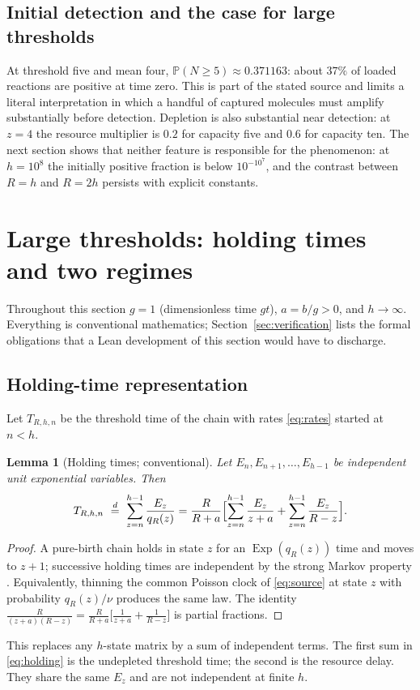 \documentclass[11pt,a4paper]{article}
\theoremstyle{plain}
\newtheorem{lemma}[theorem]{Lemma}
\theoremstyle{definition}
\theoremstyle{remark}
\newcommand{\Prob}{\mathbb P}
\DeclareMathOperator{\Ex}{Exp}
\begin{document}
\subsection{Initial detection and the case for large thresholds}\label{sec:initial}
At threshold five and mean four, $\Prob(N\ge5)\approx0.371163$: about $37\%$ of loaded reactions are positive at time zero. This is part of the stated source and limits a literal interpretation in which a handful of captured molecules must amplify substantially before detection. Depletion is also substantial near detection: at $z=4$ the resource multiplier is $0.2$ for capacity five and $0.6$ for capacity ten. The next section shows that neither feature is responsible for the phenomenon: at $h=10^{8}$ the initially positive fraction is below $10^{-10^{7}}$, and the contrast between $R=h$ and $R=2h$ persists with explicit constants.

\section{Large thresholds: holding times and two regimes}\label{sec:large}

Throughout this section $g=1$ (dimensionless time $gt$), $a=b/g>0$, and $h\to\infty$. Everything is conventional mathematics; Section~\ref{sec:verification} lists the formal obligations that a Lean development of this section would have to discharge.

\subsection{Holding-time representation}
Let $T_{R,h,n}$ be the threshold time of the chain with rates \eqref{eq:rates} started at $n<h$.

\begin{lemma}[Holding times; conventional]\label{lem:holding}
Let $E_n,E_{n+1},\dots,E_{h-1}$ be independent unit exponential variables. Then
\begin{equation}\label{eq:holding}
T_{R,h,n}\ \overset{d}{=}\ \sum_{z=n}^{h-1}\frac{E_z}{q_R(z)}
=\frac{R}{R+a}\Bigl[\sum_{z=n}^{h-1}\frac{E_z}{z+a}+\sum_{z=n}^{h-1}\frac{E_z}{R-z}\Bigr].
\end{equation}
\end{lemma}
\begin{proof}
A pure-birth chain holds in state $z$ for an $\Ex(q_R(z))$ time and moves to $z+1$; successive holding times are independent by the strong Markov property \citep{feller1968,norris1997}. Equivalently, thinning the common Poisson clock of \eqref{eq:source} at state $z$ with probability $q_R(z)/\nu$ produces the same law. The identity $\frac{R}{(z+a)(R-z)}=\frac{R}{R+a}\bigl[\frac1{z+a}+\frac1{R-z}\bigr]$ is partial fractions.
\end{proof}
This replaces any $h$-state matrix by a sum of independent terms. The first sum in \eqref{eq:holding} is the undepleted threshold time; the second is the resource delay. They share the same $E_z$ and are not independent at finite $h$.
\end{document}
